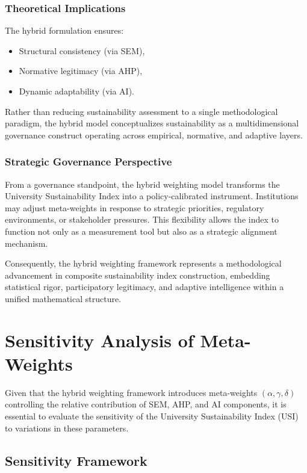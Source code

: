 \documentclass[11pt,a4paper]{article}
\begin{document}
\subsubsection{Theoretical Implications}

The hybrid formulation ensures:

\begin{itemize}
\item Structural consistency (via SEM),
\item Normative legitimacy (via AHP),
\item Dynamic adaptability (via AI).
\end{itemize}

Rather than reducing sustainability assessment to a single methodological paradigm, the hybrid model conceptualizes sustainability as a multidimensional governance construct operating across empirical, normative, and adaptive layers.

\subsubsection{Strategic Governance Perspective}

From a governance standpoint, the hybrid weighting model transforms the University Sustainability Index into a policy-calibrated instrument. Institutions may adjust meta-weights in response to strategic priorities, regulatory environments, or stakeholder pressures. This flexibility allows the index to function not only as a measurement tool but also as a strategic alignment mechanism.

Consequently, the hybrid weighting framework represents a methodological advancement in composite sustainability index construction, embedding statistical rigor, participatory legitimacy, and adaptive intelligence within a unified mathematical structure.

\section{Sensitivity Analysis of Meta-Weights}

Given that the hybrid weighting framework introduces meta-weights 
$(\alpha, \gamma, \delta)$ controlling the relative contribution of SEM, 
AHP, and AI components, it is essential to evaluate the sensitivity of 
the University Sustainability Index (USI) to variations in these parameters.

\subsection{Sensitivity Framework}
\end{document}
